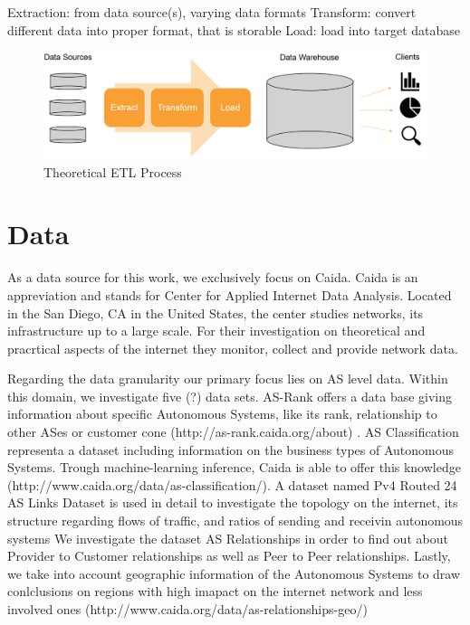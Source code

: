 \documentclass[conference]{IEEEtran}
\begin{document}
Extraction: from data source(s), varying data formats
Transform: convert different data into proper format, that is storable
Load: load into target database




\begin{figure}[htbp]
\centerline{\includegraphics[scale=0.3]{Graphics/ETLTheory.PNG}}
\caption{Theoretical ETL Process}
\label{fig}
\end{figure}

\section{Data}
As a data source for this work, we exclusively focus on Caida. Caida is an appreviation and stands for Center for Applied Internet Data Analysis. Located in the San Diego, CA in the United States, the center studies networks, its infrastructure up to a large scale. For their investigation on theoretical and pracrtical aspects of the internet they monitor, collect and provide network data. 

Regarding the data granularity our primary focus lies on AS level data. Within this domain, we investigate five (?) data sets. AS-Rank offers a data base giving information about specific Autonomous Systems, like its rank, relationship to other ASes or customer cone (http://as-rank.caida.org/about) . AS Classification representa a dataset including information on the business types of Autonomous Systems. Trough machine-learning inference, Caida is able to offer this knowledge (http://www.caida.org/data/as-classification/). A dataset named Pv4 Routed 24 AS Links Dataset is used in detail to investigate the topology on the internet, its structure regarding flows of traffic, and ratios of sending and receivin autonomous systems %
We investigate the dataset AS Relationships in order to find out about Provider to Customer relationships as well as Peer to Peer relationships.  Lastly, we take into account geographic information of the Autonomous Systems to draw conlclusions on regions with high imapact on the internet network and less involved ones (http://www.caida.org/data/as-relationships-geo/)
\end{document}

